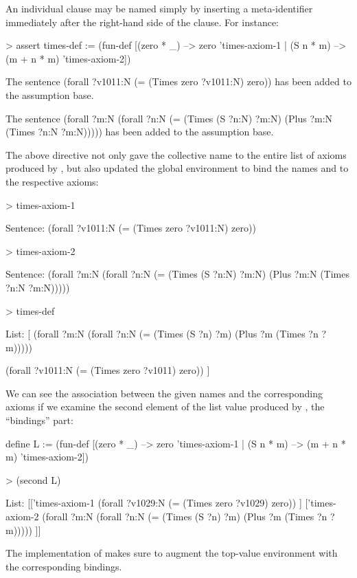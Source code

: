 An individual clause may be named simply by inserting a meta-identifier 
immediately after the right-hand side of the clause. For instance:
\begin{tcAthena}
> assert times-def := 
    (fun-def [(zero * _) --> zero        'times-axiom-1
            | (S n * m) --> (m + n * m)  'times-axiom-2])

The sentence 
(forall ?v1011:N
  (= (Times zero ?v1011:N)
     zero))
has been added to the assumption base.

The sentence 
(forall ?m:N
  (forall ?n:N
    (= (Times (S ?n:N)
              ?m:N)
       (Plus ?m:N
             (Times ?n:N ?m:N)))))
has been added to the assumption base.
\end{tcAthena}
The above directive not only gave the collective name  to the
entire list of axioms produced by , but also
updated the global environment to bind the names 
and  to the respective axioms:
\begin{tcAthena}
> times-axiom-1

Sentence: (forall ?v1011:N
            (= (Times zero ?v1011:N)
               zero))

> times-axiom-2

Sentence: (forall ?m:N
            (forall ?n:N
              (= (Times (S ?n:N)
                        ?m:N)
                 (Plus ?m:N
                       (Times ?n:N ?m:N)))))

> times-def 

List: [
(forall ?m:N
  (forall ?n:N
    (= (Times (S ?n)
              ?m)
       (Plus ?m
             (Times ?n ?m)))))
 
(forall ?v1011:N
  (= (Times zero ?v1011)
     zero))
]
\end{tcAthena}
We can see the association between the given names and the corresponding axioms
if we examine the second element of the list value produced by ,
the ``bindings'' part:
\begin{tcAthena}
define L := (fun-def [(zero * _) --> zero        'times-axiom-1
                    | (S n * m) --> (m + n * m)  'times-axiom-2])

> (second L)

List: [['times-axiom-1 
(forall ?v1029:N
  (= (Times zero ?v1029)
     zero))
] ['times-axiom-2 
(forall ?m:N
  (forall ?n:N
    (= (Times (S ?n)
              ?m)
       (Plus ?m
             (Times ?n ?m)))))
]]
\end{tcAthena} 
The implementation of  makes sure to augment
the top-value environment with the corresponding bindings. 

